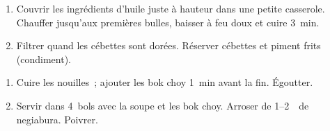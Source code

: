 \begin{recipe}
  \begin{enumerate}

  \item Couvrir les ingrédients d'huile juste à hauteur dans une petite
    casserole. Chauffer jusqu'aux premières bulles, baisser à feu doux
    et cuire 3~min.

  \item Filtrer quand les cébettes sont dorées. Réserver cébettes et
    piment frits (condiment).

  \end{enumerate}
\end{recipe}



\begin{ingredients}
\end{ingredients}

\begin{recipe}
  \begin{enumerate}

  \item Cuire les nouilles~; ajouter les bok choy 1~min avant la fin.
    Égoutter.

  \item Servir dans 4~bols avec la soupe et les bok choy. Arroser de
    1--2~\ccf\ de negiabura. Poivrer.

  \end{enumerate}
\end{recipe}

